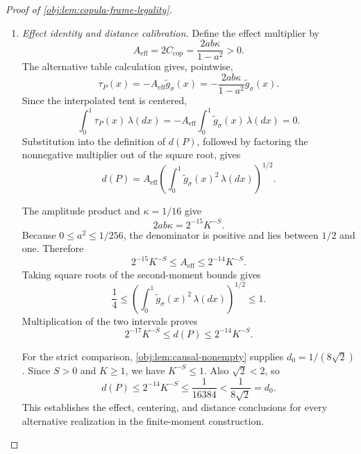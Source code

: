 \documentclass[11pt]{article}
\begin{document}
\begin{proof}[Proof of \cref{obj:lem:copula-frame-legality}]
\begin{enumerate}
For the exact coarse second moment, direct integration gives
\[
\int_0^1 b_\triangle(r_\triangle)^2\,dr_\triangle
=2\int_0^{1/2}(2r_\triangle)^2\,dr_\triangle
=\frac13.
\]
Each coarse cell therefore contributes \(1/(3M)\). The cell interiors are disjoint, the signs square to one, and the even rank supplies all \(M\) cells, so
\[
\int_0^1g_\sigma(x)^2\,\lambda(dx)=\frac13.
\]
Pointwise, the error estimate and the elementary square inequality give
\[
\begin{aligned}
g_\sigma(x)^2
&\le2\widetilde g_\sigma(x)^2
   +2\{\widetilde g_\sigma(x)-g_\sigma(x)\}^2\\
&\le2\widetilde g_\sigma(x)^2+\frac18.
\end{aligned}
\]
Integration against the probability measure \(\lambda\) yields
\[
\frac13
\le2\int_0^1\widetilde g_\sigma(x)^2\,\lambda(dx)+\frac18,
\]
which implies the lower bound below. The upper bound follows from the unit envelope:
\[
\frac1{16}
\le\int_0^1\widetilde g_\sigma(x)^2\,\lambda(dx)
\le\int_0^1 1\,\lambda(dx)=1.
\]

\item \textit{Effect identity and distance calibration.}
Define the effect multiplier by
\[
A_{\mathrm{eff}}
=2C_{\mathrm{cop}}
=\frac{2ab\kappa}{1-a^2}>0.
\]
The alternative table calculation gives, pointwise,
\[
\tau_P(x)=-A_{\mathrm{eff}}\widetilde g_\sigma(x)
=-\frac{2ab\kappa}{1-a^2}\widetilde g_\sigma(x).
\]
Since the interpolated tent is centered,
\[
\int_0^1\tau_P(x)\,\lambda(dx)
=-A_{\mathrm{eff}}
 \int_0^1\widetilde g_\sigma(x)\,\lambda(dx)=0.
\]
Substitution into the definition of \(d(P)\), followed by factoring the nonnegative multiplier out of the square root, gives
\[
d(P)
=A_{\mathrm{eff}}
 \left(\int_0^1\widetilde g_\sigma(x)^2\,\lambda(dx)\right)^{1/2}.
\]

The amplitude product and \(\kappa=1/16\) give
\[
2ab\kappa=2^{-15}K^{-S}.
\]
Because \(0\le a^2\le1/256\), the denominator is positive and lies between \(1/2\) and one. Therefore
\[
2^{-15}K^{-S}
\le A_{\mathrm{eff}}
\le2^{-14}K^{-S}.
\]
Taking square roots of the second-moment bounds gives
\[
\frac14
\le
\left(\int_0^1\widetilde g_\sigma(x)^2\,\lambda(dx)\right)^{1/2}
\le1.
\]
Multiplication of the two intervals proves
\[
2^{-17}K^{-S}\le d(P)\le2^{-14}K^{-S}.
\]

For the strict comparison, \cref{obj:lem:causal-nonempty} supplies
\(d_0=1/(8\sqrt2)\). Since \(S>0\) and \(K\ge1\), we have
\(K^{-S}\le1\). Also \(\sqrt2<2\), so
\[
d(P)\le2^{-14}K^{-S}
\le\frac1{16384}
<\frac1{8\sqrt2}=d_0.
\]
This establishes the effect, centering, and distance conclusions for every alternative realization in the finite-moment construction.


\end{enumerate}
\end{proof}
\end{document}
